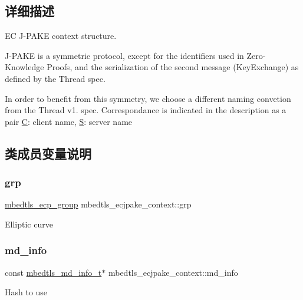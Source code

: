 \subsection{详细描述}
EC J-\/\+P\+A\+KE context structure.

J-\/\+P\+A\+KE is a symmetric protocol, except for the identifiers used in Zero-\/\+Knowledge Proofs, and the serialization of the second message (Key\+Exchange) as defined by the Thread spec.

In order to benefit from this symmetry, we choose a different naming convetion from the Thread v1. spec. Correspondance is indicated in the description as a pair \hyperlink{struct_c}{C}\+: client name, \hyperlink{struct_s}{S}\+: server name 

\subsection{类成员变量说明}
\mbox{\label{structmbedtls__ecjpake__context_ac2604256267f50b4bd75f17655c6299a}} 
\subsubsection{\texorpdfstring{grp}{grp}}
{\footnotesize\ttfamily \hyperlink{structmbedtls__ecp__group}{mbedtls\+\_\+ecp\+\_\+group} mbedtls\+\_\+ecjpake\+\_\+context\+::grp}

Elliptic curve \mbox{\label{structmbedtls__ecjpake__context_a2c8920999ae02d5742f4dcfd0a36e02c}} 
\subsubsection{\texorpdfstring{md\+\_\+info}{md\_info}}
{\footnotesize\ttfamily const \hyperlink{structmbedtls__md__info__t}{mbedtls\+\_\+md\+\_\+info\+\_\+t}$\ast$ mbedtls\+\_\+ecjpake\+\_\+context\+::md\+\_\+info}

Hash to use \mbox{\label{structmbedtls__ecjpake__context_acf904eb3228525b6b74117b2c9686fd3}} 
